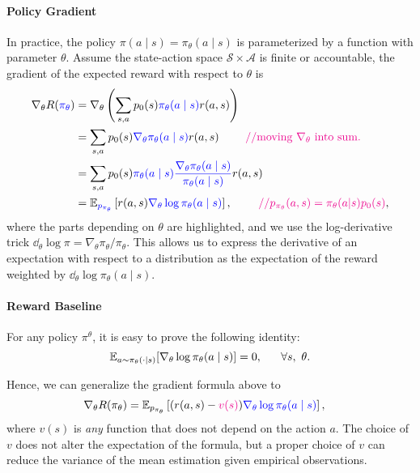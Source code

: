 \documentclass[11pt,letterpaper]{article}
\begin{document}
\paragraph{Policy Gradient} 
In practice, the policy $\pi(a \mid s) = \pi_\theta(a \mid s)$ is parameterized by a function with parameter $\theta$. 
Assume the state-action space $\mathcal S \times \mathcal A$ is finite or accountable,
the gradient of the expected reward with  respect to $\theta$ is 
\begin{align} 
\nabla_\theta R(\blue{\pi_\theta}) 
& =  \nabla_\theta \left ( \sum_{s,a} p_0(s) \blue{\pi_\theta(a \mid s)} r(a, s)  \right ) \notag \\
& = \sum_{s,a} p_0(s) \blue{\nabla_\theta \pi_\theta(a \mid s)} r(a, s) \ant{moving $\nabla_\theta$ into sum.} \notag \\ 
& = \sum_{s,a} p_0(s) \blue{\pi_\theta(a \mid s)}\blue{ \frac{ \nabla_\theta \pi_\theta(a \mid s) }{\pi_\theta(a \mid s)} } r(a, s) \notag \\
& = \E_{\blue{p_{\pi_\theta}}} \left[ r(a, s) \blue{\nabla_\theta \log \pi_\theta(a \mid s)} \right], \ant{$p_{\pi_\theta}(a,s) = \pi_\theta(a|s)p_0(s)$}, \notag %
\end{align}
where the parts depending on $\theta$ are highlighted, and we use the log-derivative trick $\dd_\theta \log \pi = \nabla_\theta \pi_\theta / \pi_\theta$. This allows us to express the derivative of an expectation with respect to a distribution as the expectation of the reward weighted by $\dd_\theta \log \pi_\theta(a \mid s)$.






\paragraph{Reward Baseline}
 For any policy $\pi^\theta$, it is easy to prove the following identity: 
 $$
 \mathbb{E}_{a\sim \pi_\theta(\cdot|s)}[\nabla_\theta \log \pi_\theta(a\mid s)] =0,~~~~~ \forall s,~\theta.  
 $$
 
Hence, we can generalize the gradient formula above to 
\begin{align} \label{equ:pcgrad2}
\nabla_\theta  R(\pi_\theta ) 
& = \mathbb{E}_{p_{\pi_\theta}}  \left [  (r(a,s) - \textcolor{magenta}{v(s)})  \textcolor{blue}{\nabla_\theta  \log  \pi_\theta (a\mid s)}  \right ],
\end{align}
where $v(s)$ is \emph{any} function that does not depend on the action $a$. 
The choice of $v$ does not alter the expectation of the formula, but a proper choice of $v$ can reduce the variance of the mean estimation given empirical observations. 
\end{document}
